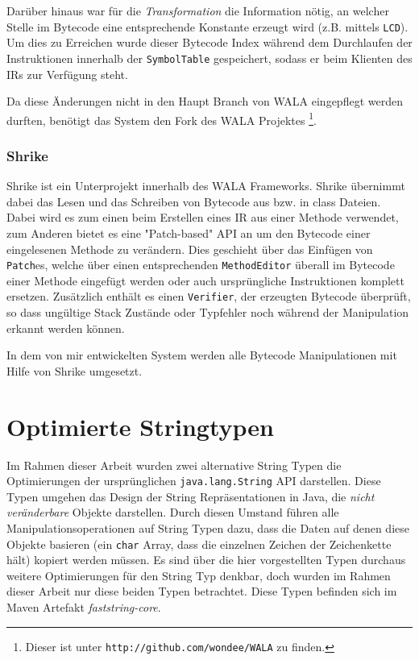 Darüber hinaus war für die \textit{Transformation} die Information nötig, an welcher Stelle im Bytecode eine
entsprechende Konstante erzeugt wird (z.B. mittels \texttt{LCD}). Um dies zu Erreichen wurde dieser Bytecode 
Index während dem Durchlaufen der Instruktionen innerhalb der \texttt{SymbolTable} gespeichert, sodass er 
beim Klienten des IRs zur Verfügung steht.

Da diese Änderungen nicht in den Haupt Branch von WALA eingepflegt werden durften, benötigt das System den 
Fork des WALA Projektes \footnote{Dieser ist unter \texttt{http://github.com/wondee/WALA} zu finden.}.


\subsection{Shrike}

Shrike ist ein Unterprojekt innerhalb des WALA Frameworks. Shrike übernimmt dabei das Lesen und das 
Schreiben von Bytecode aus bzw. in class Dateien. Dabei wird es zum einen beim Erstellen eines IR aus einer 
Methode verwendet, zum Anderen bietet es eine "Patch-based" API an um den Bytecode einer eingelesenen 
Methode zu verändern. Dies geschieht über das Einfügen von \texttt{Patch}es, welche über einen 
entsprechenden \texttt{MethodEditor} überall im Bytecode einer Methode eingefügt werden oder auch 
ursprüngliche Instruktionen komplett ersetzen. Zusätzlich enthält es einen \texttt{Verifier}, der erzeugten 
Bytecode überprüft, so dass ungültige Stack Zustände oder Typfehler noch während der Manipulation erkannt 
werden können. 

In dem von mir entwickelten System werden alle Bytecode Manipulationen mit Hilfe von Shrike umgesetzt. 

\chapter{Optimierte Stringtypen}\label{stringLabels}

Im Rahmen dieser Arbeit wurden zwei alternative String Typen die Optimierungen der ursprünglichen
\texttt{java.lang.String} API darstellen. Diese Typen umgehen das Design der String Repräsentationen
in Java, die \textit{nicht veränderbare} Objekte darstellen. Durch diesen Umstand führen alle
Manipulationsoperationen auf String Typen dazu, dass die Daten auf denen diese Objekte basieren
(ein \texttt{char} Array, dass die einzelnen Zeichen der Zeichenkette hält) kopiert werden müssen.
Es sind über die hier vorgestellten Typen durchaus weitere Optimierungen für den String Typ denkbar, 
doch wurden im Rahmen dieser Arbeit nur diese beiden Typen betrachtet. Diese Typen befinden sich
im Maven Artefakt \textit{faststring-core}.


